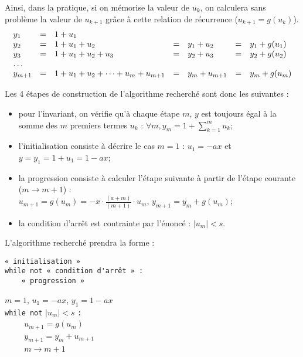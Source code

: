 \documentclass[11pt,a4paper,colorlinks,breaklinks]{article}
\begin{document}
Ainsi, dans la pratique, si on mémorise la valeur de $u_k$, on calculera sans problème 
la valeur de $u_{k+1}$ grâce à cette relation de récurrence ($u_{k+1} = g(u_k)$).
$$\begin{array}{lllllll}
y_1     &=& 1 + u_1 \\
y_2     &=& 1 + u_1 + u_2                          &=& y_1 + u_2         &=& y_1 + g(u_1) \\
y_3     &=& 1 + u_1 + u_2 + u_3                    &=& y_2 + u_3         &=& y_2 + g(u_2)\\
\multicolumn{7}{l}{\ldots}\\
y_{m+1} &=& 1 + u_1 + u_2 + \cdots + u_m + u_{m+1} &=& y_{m} + u_{m+1}   &=& y_m + g(u_{m})
\end{array}$$

Les 4 étapes de construction de l'algorithme recherché sont donc les suivantes :
\begin{itemize}
\item pour l'invariant, on vérifie qu'à chaque étape $m$, $y$ est toujours égal à la somme 
	des $m$ premiers termes $u_k$ : 
	$\displaystyle \forall m, y_m = 1 + \sum_{k=1}^m u_k$;
\item l'initialisation consiste à décrire le cas $m = 1$ : 
	$u_1 = -ax$ et $y = y_1 = 1 + u_1 = 1 - ax$;
\item la progression consiste à calculer l'étape suivante à partir de l'étape courante ($m \rightarrow m+1$) :\\
	$\displaystyle u_{m+1} = g(u_m) = - x\cdot\frac{(a+m)}{(m+1)}\cdot u_{m}$, $y_{m+1} = y_{m} + g(u_{m})$;
\item la condition d'arrêt est contrainte par l'énoncé : 
	$|u_m| < s$.
\end{itemize}
\vspace*{3mm}

\noindent L'algorithme recherché prendra la forme :\\
\begin{minipage}[t]{8cm}
\begin{Verbatim}
« initialisation »
while not « condition d'arrêt » :
    « progression »
\end{Verbatim}
\end{minipage}
\hfill
\begin{minipage}[t]{7cm}\footnotesize
$m = 1$, $u_1 = -ax$, $y_1 = 1 - ax$\\
\texttt{while not} $|u_m| < s$ \texttt{:}\\
\mbox{}\texttt{\ \ \ \ } $u_{m+1} = g(u_m)$\\
\mbox{}\texttt{\ \ \ \ } $y_{m+1} = y_{m} + u_{m+1}$\\
\mbox{}\texttt{\ \ \ \ } $m \rightarrow m+1$
\end{minipage}
\end{document}
